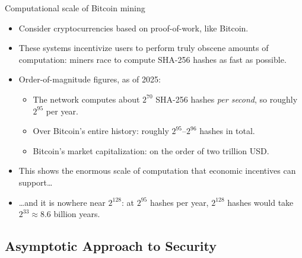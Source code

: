 \ifdefined\PRESENTATION\else\PassOptionsToClass{handout}{beamer}\fi\documentclass[aspectratio=169, lualatex]{beamer}
\begin{document}
\begin{frame}{Computational scale of Bitcoin mining}
	\begin{itemize}
		\item Consider cryptocurrencies based on proof-of-work, like Bitcoin.
		\item These systems incentivize users to perform truly obscene amounts of computation: miners race to compute SHA-256 hashes as fast as possible.
		\item Order-of-magnitude figures, as of 2025:
		      \begin{itemize}
			      \item The network computes about $2^{70}$ SHA-256 hashes \textit{per second}, so roughly $2^{95}$ per year.
			      \item Over Bitcoin's entire history: roughly $2^{95}$--$2^{96}$ hashes in total.
			      \item Bitcoin's market capitalization: on the order of two trillion USD.
		      \end{itemize}
		\item This shows the enormous scale of computation that economic incentives can support\ldots
		\item \ldots and it is nowhere near $2^{128}$: at $2^{95}$ hashes per year, $2^{128}$ hashes would take $2^{33} \approx 8.6$ billion years.
	\end{itemize}
\end{frame}

\subsection{Asymptotic Approach to Security}
\end{document}
